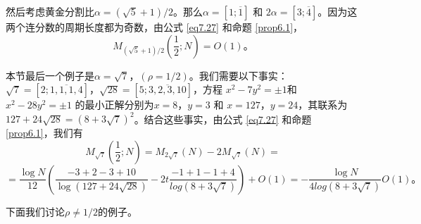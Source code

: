 \documentclass[11pt,a4paper]{article}
\theoremstyle{definition}
\newcommand{\refeq}[1]{公式 \ref{#1}}
\newcommand{\refprop}[1]{命题 \ref{#1}}
\numberwithin{equation}{section}
\newcommand{\comma}{\text{，}}
\newcommand{\juhao}{\text{。}}
\newcommand{\pmone}{\pm1}
\newcommand{\xysolution}[2]{$ x=#1\comma y=#2 $}
\newcommand{\pelleq}[2]{ $ x^{2}-#1y^{2}=#2 $} %
\newcommand{\periodrep}[3]{$ \sqrt{#1}=\left[#2;\overline{#3}\right] $}
\newcommand{\erfenzy}{\dfrac{1}{2}}
\begin{document}
然后考虑黄金分割比$ \alpha=(\sqrt{5}+1)/2 $。那么$ \alpha=\left[1;\overline{1}\right] $ 和 $ 2\alpha=\left[3;\overline{4}\right] $。因为这两个连分数的周期长度都为奇数，由\refeq{eq7.27} 和\refprop{prop6.1}，
\begin{equation}\label{eq7.30}
M_{(\sqrt{5}+1)/2 }\left(\erfenzy;N\right)=O(1)\juhao
\end{equation}

本节最后一个例子是$ \alpha=\sqrt{7}\comma\left(\rho=1/2\right) $。我们需要以下事实：\periodrep{7}{2}{1,1,1,4}，\periodrep{28}{5}{3,2,3,10}，方程\pelleq{7}{\pmone}和\pelleq{28}{\pmone} 的最小正解分别为\xysolution{8}{3} 和 \xysolution{127}{24}，其联系为$ 127+24\sqrt{28}=(8+3\sqrt{7})^{2} $。结合这些事实，由\refeq{eq7.27} 和\refprop{prop6.1}，我们有
\[ M_{\sqrt{7}}\left(\erfenzy;N\right)=M_{2\sqrt{7}}\left(N\right)-2M_{\sqrt{7}}\left(N\right)= \]
\begin{equation}\label{eq7.31}
=\dfrac{\log N}{12}\left(\dfrac{-3+2-3+10}{\log(127+24\sqrt{28})}-2t\dfrac{-1+1-1+4}{log(8+3\sqrt{7})}\right)+O(1)=-\dfrac{\log N}{4log(8+3\sqrt{7})}O(1)\juhao
\end{equation}  

下面我们讨论$ \rho\neq1/2 $的例子。
\end{document}
